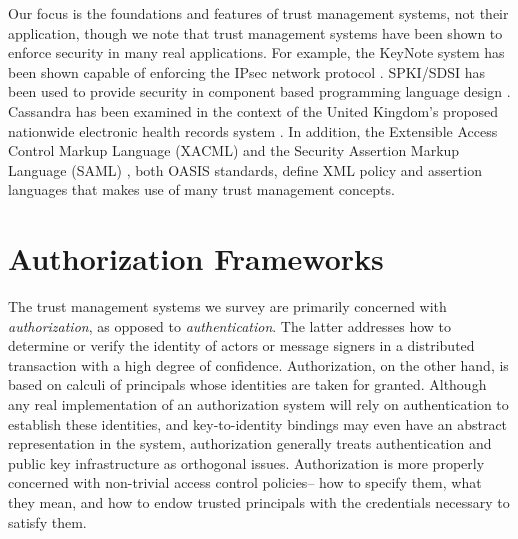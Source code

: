 Our focus is the foundations and features of trust management systems, not
their application, though we note that trust management systems have been
shown to enforce security in many real applications. For example, the
KeyNote system has been shown capable of enforcing the IPsec network
protocol \cite{Blaze:TMIPS,Blaze:EKTMS}. SPKI/SDSI has been used to provide
security in component based programming language design \cite{Liu:CSI}.
Cassandra has been examined in the context of the United Kingdom's proposed
nationwide electronic health records system \cite{Becker:CFTMAEHR}. In
addition, the Extensible Access Control Markup Language (XACML)
\cite{OASIS:XACMLTC} and the Security Assertion Markup Language (SAML)
\cite{OASIS:SSTC}, both OASIS standards, define XML policy and assertion
languages that makes use of many trust management concepts.


\section{Authorization Frameworks}

The trust management systems we survey are primarily concerned with
\emph{authorization}, as opposed to \emph{authentication}.  The latter
addresses how to determine or verify the identity of actors or message
signers in a distributed transaction with a high degree of confidence.
Authorization, on the other hand, is based on calculi of principals
whose identities are taken for granted.  Although any real
implementation of an authorization system will rely on authentication
to establish these identities, and key-to-identity bindings may even
have an abstract representation in the system, authorization generally
treats authentication and public key infrastructure as orthogonal
issues.  Authorization is more properly concerned with non-trivial
access control policies-- how to specify them, what they mean, and how
to endow trusted principals with the credentials necessary to satisfy
them.

